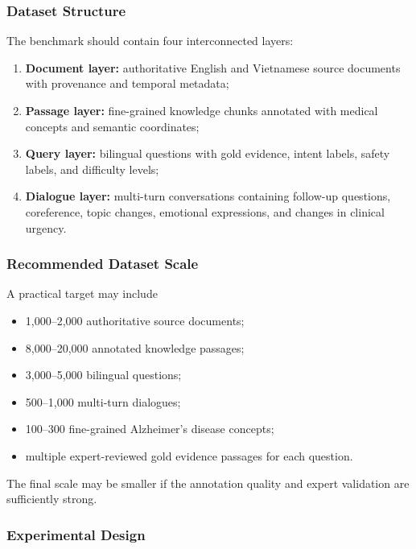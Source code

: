 \documentclass{article}
\begin{document}
\subsubsection{Dataset Structure}

The benchmark should contain four interconnected layers:
\begin{enumerate}
    \item \textbf{Document layer:} authoritative English and Vietnamese source documents with provenance and temporal metadata;

    \item \textbf{Passage layer:} fine-grained knowledge chunks annotated with medical concepts and semantic coordinates;

    \item \textbf{Query layer:} bilingual questions with gold evidence, intent labels, safety labels, and difficulty levels;

    \item \textbf{Dialogue layer:} multi-turn conversations containing follow-up questions, coreference, topic changes, emotional expressions, and changes in clinical urgency.
\end{enumerate}

\subsubsection{Recommended Dataset Scale}

A practical target may include
\begin{itemize}
    \item 1,000--2,000 authoritative source documents;
    \item 8,000--20,000 annotated knowledge passages;
    \item 3,000--5,000 bilingual questions;
    \item 500--1,000 multi-turn dialogues;
    \item 100--300 fine-grained Alzheimer's disease concepts;
    \item multiple expert-reviewed gold evidence passages for each question.
\end{itemize}

The final scale may be smaller if the annotation quality and expert validation
are sufficiently strong.

\subsubsection{Experimental Design}
\end{document}
